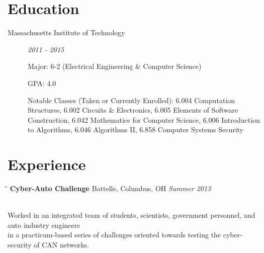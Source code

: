 \documentclass{res}
\begin{document}

	\address{
		Room 637 \\
		229 Vassar Street \\
		Cambridge, MA  02139
	}

	\address{
		\bf woursler.com \\
		woursler@mit.edu \\
		(541)-601-8295
	}

	\begin{resume}

		\vspace{-10pt}
		\section{Education}
			\begin{description}

				\item[Massachusetts Institute of Technology] \textit{2011 - 2015}

				Major: 6-2 (Electrical Engineering \& Computer Science)

				GPA: 4.0

				Notable Classes (Taken or Currently Enrolled):
				6.004 Computation Structures,
				6.002 Circuits \& Electronics,
				6.005 Elements of Software Construction,
				6.042 Mathematics for Computer Science,
				6.006 Introduction to Algorithms,
				6.046 Algorithms II,
				6.858 Computer Systems Security

			\end{description}

		\vspace{-20pt}
		\section{Experience}
			\vspace{-0.1in}

			\begin{tabbing}
				\hspace{2.3in}\= \hspace{2.6in}\= \kill %
				{\bf Cyber-Auto Challenge}	\>Battelle, Columbus, OH	\> \textit{Summer 2013}

\\Worked in an integrated team of students, scientists, government personnel, and auto industry engineers \\in a practicum-based series of challenges oriented towards testing the cyber-security of CAN networks. 
			\end{tabbing}\vspace{-20pt}


\end{resume}
\end{document}
